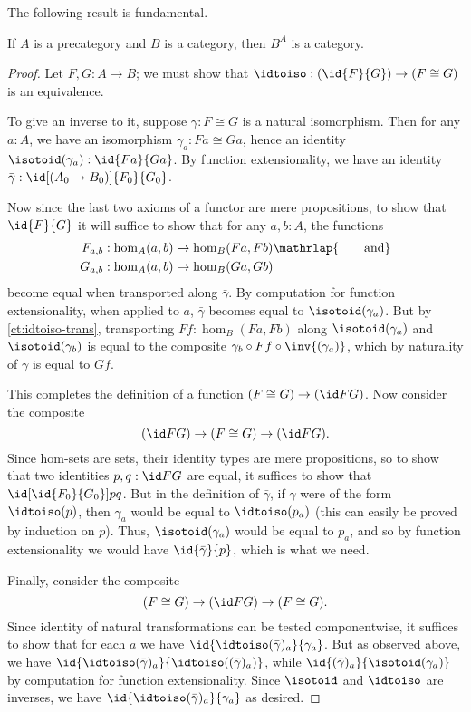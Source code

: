 The following result is fundamental.

\begin{thm}\label{ct:functor-cat}
  If $A$ is a precategory and $B$ is a category, then $B^A$ is a category.
\end{thm}
\begin{proof}
  Let $F,G:A\to B$; we must show that $\idtoiso:(\id{F}{G}) \to (F\cong G)$ is an equivalence.

  To give an inverse to it, suppose $\gamma:F\cong G$ is a natural isomorphism.
  Then for any $a:A$, we have an isomorphism $\gamma_a:Fa \cong Ga$, hence an identity $\isotoid(\gamma_a):\id{Fa}{Ga}$.
  By function extensionality, we have an identity $\bar{\gamma}:\id[(A_0\to B_0)]{F_0}{G_0}$.

  Now since the last two axioms of a functor are mere propositions, to show that $\id{F}{G}$ it will suffice to show that for any $a,b:A$, the functions
  \begin{align*}
    F_{a,b}&:\hom_A(a,b) \to \hom_B(Fa,Fb)\mathrlap{\qquad\text{and}}\\
    G_{a,b}&:\hom_A(a,b) \to \hom_B(Ga,Gb)
  \end{align*}
  become equal when transported along $\bar\gamma$.
  By computation for function extensionality, when applied to $a$, $\bar\gamma$ becomes equal to $\isotoid(\gamma_a)$.
  But by \cref{ct:idtoiso-trans}, transporting $Ff:\hom_B(Fa,Fb)$ along $\isotoid(\gamma_a)$ and $\isotoid(\gamma_b)$ is equal to the composite $\gamma_b\circ Ff\circ \inv{(\gamma_a)}$, which by naturality of $\gamma$ is equal to $Gf$.

  This completes the definition of a function $(F\cong G) \to (\id F G)$.
  Now consider the composite
  \[ (\id F G) \to (F\cong G) \to (\id F G). \]
  Since hom-sets are sets, their identity types are mere propositions, so to show that two identities $p,q:\id F G$ are equal, it suffices to show that $\id[\id{F_0}{G_0}]{p}{q}$.
  But in the definition of $\bar\gamma$, if $\gamma$ were of the form $\idtoiso(p)$, then $\gamma_a$ would be equal to $\idtoiso(p_a)$ (this can easily be proved by induction on $p$).
  Thus, $\isotoid(\gamma_a)$ would be equal to $p_a$, and so by function extensionality we would have $\id{\bar\gamma}{p}$, which is what we need.

  Finally, consider the composite
  \[(F\cong G)\to  (\id F G) \to (F\cong G). \]
  Since identity of natural transformations can be tested componentwise, it suffices to show that for each $a$ we have $\id{\idtoiso(\bar\gamma)_a}{\gamma_a}$.
  But as observed above, we have $\id{\idtoiso(\bar\gamma)_a}{\idtoiso((\bar\gamma)_a)}$, while $\id{(\bar\gamma)_a}{\isotoid(\gamma_a)}$ by computation for function extensionality.
  Since $\isotoid$ and $\idtoiso$ are inverses, we have $\id{\idtoiso(\bar\gamma)_a}{\gamma_a}$ as desired.
\end{proof}

